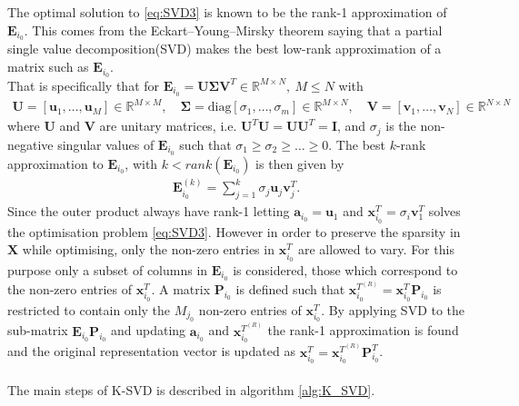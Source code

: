 The optimal solution to \eqref{eq:SVD3} is known to be the rank-1 approximation of $\textbf{E}_{i_{0}}$. This comes from the Eckart–Young–Mirsky theorem\cite{?} saying that a partial single value decomposition(SVD) makes the best low-rank approximation of a matrix such as $\textbf{E}_{i_0}$.\\
That is specifically that for $\textbf{E}_{i_0}=\textbf{U}\boldsymbol{\Sigma}\textbf{V}^T\in \mathbb{R}^{M\times N},\ M \leq N$ with 
\begin{align*}
\textbf{U}=\left[\textbf{u}_1, \hdots, \textbf{u}_M\right] \in \mathbb{R}^{M\times M}, \quad \boldsymbol{\Sigma}=\text{diag}\left[\sigma_1, \hdots , \sigma_m \right] \in \mathbb{R}^{M\times N}, \quad \textbf{V}=\left[\textbf{v}_1, \hdots, \textbf{v}_N\right] \in \mathbb{R}^{N\times N} 
\end{align*}  
where $\textbf{U}$ and $\textbf{V}$ are unitary matrices, i.e. $\textbf{U}^T\textbf{U}=\textbf{UU}^T=\textbf{I}$, and $\sigma_j$ is the non-negative singular values of $\textbf{E}_{i_0}$ such that $\sigma_1\geq \sigma_2 \geq \hdots \geq 0$. The best $k$-rank approximation to $\textbf{E}_{i_0}$, with $k< rank(\textbf{E}_{i_0})$ is then given by\cite{Wiki..} 
\begin{align*}
\textbf{E}_{i_{0}}^{(k)}= \sum_{j=1}^{k}\sigma_j\textbf{u}_{j}\textbf{v}_{j}^T.
\end{align*} 
Since the outer product always have rank-1 letting $\textbf{a}_{i_0}=\textbf{u}_1$ and $\textbf{x}_{i_0}^T = \sigma_{i}\textbf{v}_{1}^T$ solves the optimisation problem \eqref{eq:SVD3}.
However in order to preserve the sparsity in $\textbf{X}$ while optimising, only the non-zero entries in $\textbf{x}_{i_0}^T$ are allowed to vary. For this purpose only a subset of columns in $\textbf{E}_{i_0}$ is considered, those which correspond to the non-zero entries of $\textbf{x}_{i_0}^T$. A matrix $\textbf{P}_{i_0}$ is defined such that $\textbf{x}_{i_0}^{T^{(R)}}=\textbf{x}_{i_0}^T\textbf{P}_{i_0} $ is restricted to contain only the $M_{j_0}$ non-zero entries of $\textbf{x}_{i_0}^T$. By applying SVD to the  sub-matrix $\textbf{E}_{i_0}\textbf{P}_{i_0}$ and updating $\textbf{a}_{i_0}$ and $\textbf{x}_{i_0}^{T^{(R)}}$ the rank-1 approximation is found and the original representation vector is updated as $\textbf{x}_{i_0}^{T}=\textbf{x}_{i_0}^{T^{(R)}}\textbf{P}_{i_0}^{T}$.  \\ \\
The main steps of K-SVD is described in algorithm \ref{alg:K_SVD}. 

